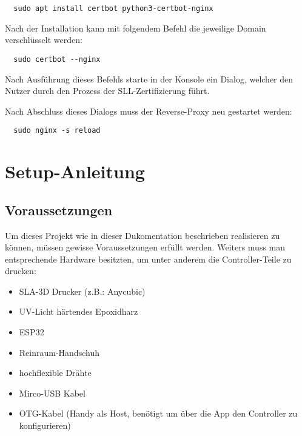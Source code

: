 \documentclass[paper=a4,12pt]{scrreprt}
\begin{document}
\begin{lstlisting}
  sudo apt install certbot python3-certbot-nginx
\end{lstlisting}

Nach der Installation kann mit folgendem Befehl die jeweilige Domain verschlüsselt werden:\newline

\begin{lstlisting}
  sudo certbot --nginx
\end{lstlisting}

Nach Ausführung dieses Befehls starte in der Konsole ein Dialog, welcher den Nutzer durch den Prozess der SLL-Zertifizierung führt.\newline

Nach Abschluss dieses Dialogs muss der Reverse-Proxy neu gestartet werden:\newline

\begin{lstlisting}
  sudo nginx -s reload
\end{lstlisting}

\chapter{Setup-Anleitung}

\section{Voraussetzungen}

Um dieses Projekt wie in dieser Dukomentation beschrieben realisieren zu können, müssen gewisse Voraussetzungen erfüllt werden. Weiters muss man entsprechende Hardware besitzten, um unter anderem die
Controller-Teile zu drucken:\newline

\begin{itemize}
  \item SLA-3D Drucker (z.B.: Anycubic)
  \item UV-Licht härtendes Epoxidharz
  \item ESP32
  \item Reinraum-Handschuh
  \item hochflexible Drähte
  \item Mirco-USB Kabel
  \item OTG-Kabel (Handy als Host, benötigt um über die App den Controller zu konfigurieren)
\end{itemize}
\end{document}
